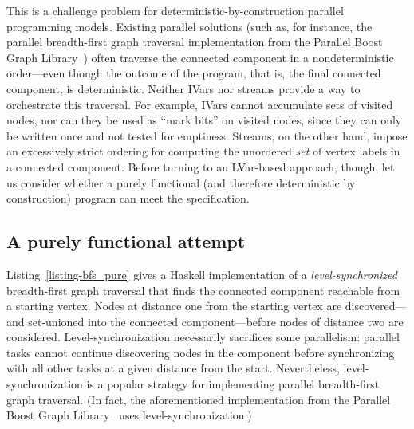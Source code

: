 This is a challenge problem for deterministic-by-construction parallel
programming models. Existing parallel solutions (such as, for instance, the
parallel breadth-first graph traversal implementation from the
Parallel Boost Graph Library~) often traverse the
connected component in a nondeterministic order---even though the
outcome of the program, that is, the final connected component, is
deterministic.  Neither IVars nor streams provide a way 
to orchestrate this traversal.  For
example, IVars cannot accumulate sets of visited nodes, nor can they
be used as ``mark bits'' on visited nodes, since they can only be
written once and not tested for emptiness.  Streams, on the other
hand, impose an excessively strict ordering for computing the
unordered \emph{set} of vertex labels in a connected component.
Before turning to an LVar-based approach, though, let us consider
whether a purely functional (and therefore deterministic by
construction) program can meet the specification.

\subsection{A purely functional attempt}

\singlespacing  \doublespacing

Listing~\ref{listing-bfs_pure} gives a Haskell implementation of a
\emph{level-synchronized} breadth-first graph traversal that finds the
connected component reachable from a starting vertex.  Nodes at
distance one from the starting vertex are discovered---and set-unioned
into the connected component---before nodes of distance two are
considered.  Level-synchronization necessarily sacrifices some
parallelism: parallel tasks cannot continue discovering nodes in the
component before synchronizing with all other tasks at a given
distance from the start.  Nevertheless, level-synchronization is a
popular strategy for implementing parallel breadth-first graph
traversal.  (In fact, the aforementioned implementation from the
Parallel Boost Graph Library~ uses
level-synchronization.)

